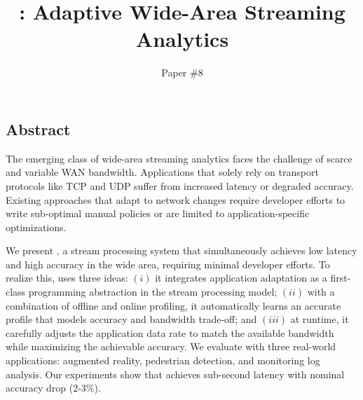 \documentclass[twocolumn, 9pt]{article}
\begin{document}
\title{\sysname{}: Adaptive Wide-Area Streaming Analytics}
\author{Paper \#8}
\date{}
\maketitle

\subsection*{Abstract}

The emerging class of wide-area streaming analytics faces the challenge of
scarce and variable WAN bandwidth. Applications that solely rely on transport
protocols like TCP and UDP suffer from increased latency or degraded
accuracy. Existing approaches that adapt to network changes require developer
efforts to write sub-optimal manual policies or are limited to
application-specific optimizations.

We present \sysname{}, a stream processing system that simultaneously achieves
low latency and high accuracy in the wide area, requiring minimal developer
efforts. To realize this, \sysname{} uses three ideas: $(i)$ it integrates
application adaptation as a first-class programming abstraction in the stream
processing model; $(ii)$ with a combination of offline and online profiling, it
automatically learns an accurate profile that models accuracy and bandwidth
trade-off; and $(iii)$ at runtime, it carefully adjusts the application data
rate to match the available bandwidth while maximizing the achievable
accuracy. We evaluate \sysname{} with three real-world applications: augmented
reality, pedestrian detection, and monitoring log analysis. Our experiments show
that \sysname{} achieves sub-second latency with nominal accuracy drop (2-3\%).










% 

{\footnotesize 
}

% 
\end{document}
